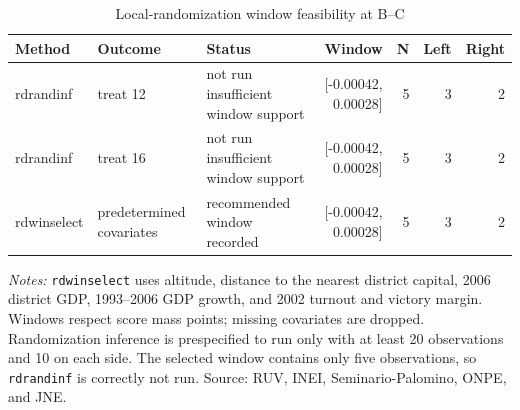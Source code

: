 \begin{table}[!htbp]
\centering
\small
\caption{Local-randomization window feasibility at B--C}
\label{tab:rd_validation_local_randomization}
\begin{tabular}{lllrrrr}
\toprule
Method & Outcome & Status & Window & N & Left & Right \\
\midrule
rdrandinf & treat 12 & not run insufficient window support & [-0.00042, 0.00028] & 5 & 3 & 2 \\
rdrandinf & treat 16 & not run insufficient window support & [-0.00042, 0.00028] & 5 & 3 & 2 \\
rdwinselect & predetermined covariates & recommended window recorded & [-0.00042, 0.00028] & 5 & 3 & 2 \\
\bottomrule
\end{tabular}
\parbox{0.97\linewidth}{\footnotesize \textit{Notes:} \texttt{rdwinselect} uses altitude, distance to the nearest district capital, 2006 district GDP, 1993--2006 GDP growth, and 2002 turnout and victory margin. Windows respect score mass points; missing covariates are dropped. Randomization inference is prespecified to run only with at least 20 observations and 10 on each side. The selected window contains only five observations, so \texttt{rdrandinf} is correctly not run. Source: RUV, INEI, Seminario-Palomino, ONPE, and JNE.}
\end{table}
